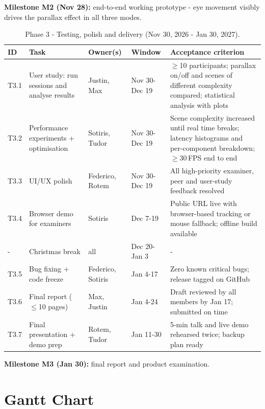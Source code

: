 \documentclass[11pt,a4paper]{article}
\begin{document}
\vspace{-2mm}
\noindent\textbf{Milestone M2 (Nov 28):} end-to-end working prototype - eye
movement visibly drives the parallax effect in all three modes.

\begin{table}[H]
\centering
\caption{Phase 3 - Testing, polish and delivery (Nov 30, 2026 - Jan 30, 2027).}
\label{tab:p3}
\footnotesize
\renewcommand{\arraystretch}{1.05}
\begin{tabularx}{\textwidth}{@{}l >{\raggedright\arraybackslash}p{38mm} >{\raggedright\arraybackslash}p{21mm} >{\raggedright\arraybackslash}p{20mm} L@{}}
\toprule
\textbf{ID} & \textbf{Task} & \textbf{Owner(s)} & \textbf{Window} & \textbf{Acceptance criterion} \\
\midrule
T3.1 & User study: run sessions and analyse results & Justin, Max & Nov 30-Dec 19 & $\geq$10 participants; parallax on/off and scenes of different complexity compared; statistical analysis with plots \\
T3.2 & Performance experiments + optimisation & Sotiris, Tudor & Nov 30-Dec 19 & Scene complexity increased until real time breaks; latency histograms and per-component breakdown; $\geq$30\,FPS end to end \\
T3.3 & UI/UX polish & Federico, Rotem & Nov 30-Dec 19 & All high-priority examiner, peer and user-study feedback resolved \\
T3.4 & Browser demo for examiners & Sotiris & Dec 7-19 & Public URL live with browser-based tracking or mouse fallback; offline build available \\
- & Christmas break & all & Dec 20-Jan 3 & - \\
T3.5 & Bug fixing + code freeze & Federico, Sotiris & Jan 4-17 & Zero known critical bugs; release tagged on GitHub \\
T3.6 & Final report ($\leq$10 pages) & Max, Justin & Jan 4-24 & Draft reviewed by all members by Jan 17; submitted on time \\
T3.7 & Final presentation + demo prep & Rotem, Tudor & Jan 11-30 & 5-min talk and live demo rehearsed twice; backup plan ready \\
\bottomrule
\end{tabularx}
\end{table}

\vspace{-2mm}
\noindent\textbf{Milestone M3 (Jan 30):} final report and product
examination.

\section{Gantt Chart}
\label{sec:gantt}
\end{document}
